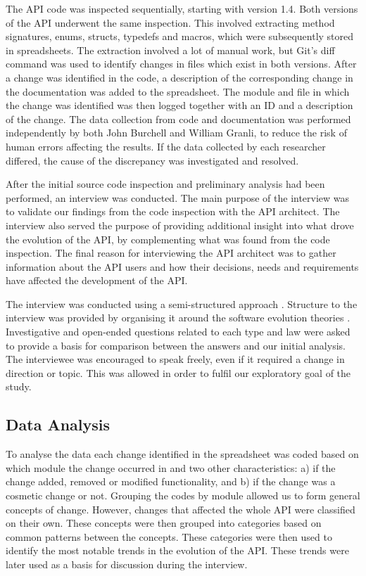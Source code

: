 \documentclass{sig-alternate}
\begin{document}
The API code was inspected sequentially, starting with version 1.4. Both versions of the API underwent the same inspection. This involved extracting method signatures, enums, structs, typedefs and macros, which were subsequently stored in spreadsheets. The extraction involved a lot of manual work, but Git's \cite{git} diff command was used to identify changes in files which exist in both versions. After a change was identified in the code, a description of the corresponding change in the documentation was added to the spreadsheet. The module and file in which the change was identified was then logged together with an ID and a description of the change. The data collection from code and documentation was performed independently by both John Burchell and William Granli, to reduce the risk of human errors affecting the results. If the data collected by each researcher differed, the cause of the discrepancy was investigated and resolved. 

After the initial source code inspection and preliminary analysis had been performed, an interview was conducted. The main purpose of the interview was to validate our findings from the code inspection with the API architect. The interview also served the purpose of providing additional insight into what drove the evolution of the API, by complementing what was found from the code inspection. The final reason for interviewing the API architect was to gather information about the API users and how their decisions, needs and requirements have affected the development of the API. 

The interview was conducted using a semi-structured approach \cite{robson2002real}. Structure to the interview was provided by organising it around the software evolution theories \cite{chapin2001types, lehman90sview}. Investigative and open-ended questions related to each type and law were asked to provide a basis for comparison between the answers and our initial analysis. The interviewee was encouraged to speak freely, even if it required a change in direction or topic. This was allowed in order to fulfil our exploratory goal of the study. 




\subsection{Data Analysis} \label{data_analysis}

To analyse the data each change identified in the spreadsheet was coded based on which module the change occurred in and two other characteristics: a) if the change added, removed or modified functionality, and b) if the change was a cosmetic change or not.
Grouping the codes by module allowed us to form general concepts of change. However, changes that affected the whole API were classified on their own. %
These concepts were then grouped into categories based on common patterns between the concepts.
These categories were then used to identify the most notable trends in the evolution of the API. These trends were later used as a basis for discussion during the interview.
\end{document}
